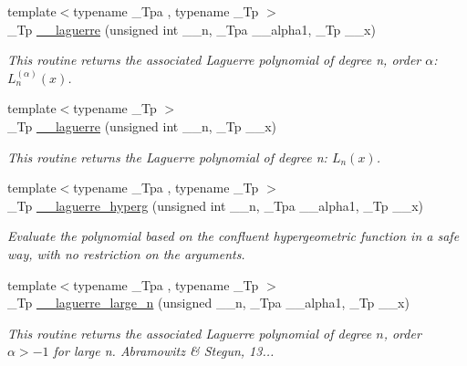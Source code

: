 \begin{DoxyCompactItemize}
\item 
{\footnotesize template$<$typename \+\_\+\+Tpa , typename \+\_\+\+Tp $>$ }\\\+\_\+\+Tp \hyperlink{namespacestd_1_1____detail_a9e0b69452cb6c0ca0115c516afd46816}{\+\_\+\+\_\+laguerre} (unsigned int \+\_\+\+\_\+n, \+\_\+\+Tpa \+\_\+\+\_\+alpha1, \+\_\+\+Tp \+\_\+\+\_\+x)
\begin{DoxyCompactList}\small\item\em This routine returns the associated Laguerre polynomial of degree n, order $ \alpha $\+: $ L_n^{(\alpha)}(x) $. \end{DoxyCompactList}\item 
{\footnotesize template$<$typename \+\_\+\+Tp $>$ }\\\+\_\+\+Tp \hyperlink{namespacestd_1_1____detail_aa714c4983a3cb7d9d18e0c2c5a8f6826}{\+\_\+\+\_\+laguerre} (unsigned int \+\_\+\+\_\+n, \+\_\+\+Tp \+\_\+\+\_\+x)
\begin{DoxyCompactList}\small\item\em This routine returns the Laguerre polynomial of degree n\+: $ L_n(x) $. \end{DoxyCompactList}\item 
{\footnotesize template$<$typename \+\_\+\+Tpa , typename \+\_\+\+Tp $>$ }\\\+\_\+\+Tp \hyperlink{namespacestd_1_1____detail_a7908be328a4546d77802076196ae4396}{\+\_\+\+\_\+laguerre\+\_\+hyperg} (unsigned int \+\_\+\+\_\+n, \+\_\+\+Tpa \+\_\+\+\_\+alpha1, \+\_\+\+Tp \+\_\+\+\_\+x)
\begin{DoxyCompactList}\small\item\em Evaluate the polynomial based on the confluent hypergeometric function in a safe way, with no restriction on the arguments. \end{DoxyCompactList}\item 
{\footnotesize template$<$typename \+\_\+\+Tpa , typename \+\_\+\+Tp $>$ }\\\+\_\+\+Tp \hyperlink{namespacestd_1_1____detail_abfce1c88345c266f5bcc9831766ed760}{\+\_\+\+\_\+laguerre\+\_\+large\+\_\+n} (unsigned \+\_\+\+\_\+n, \+\_\+\+Tpa \+\_\+\+\_\+alpha1, \+\_\+\+Tp \+\_\+\+\_\+x)
\begin{DoxyCompactList}\small\item\em This routine returns the associated Laguerre polynomial of degree $ n $, order $ \alpha > -1 $ for large n. Abramowitz \& Stegun, 13... \end{DoxyCompactList}\item 

\end{DoxyCompactItemize}
